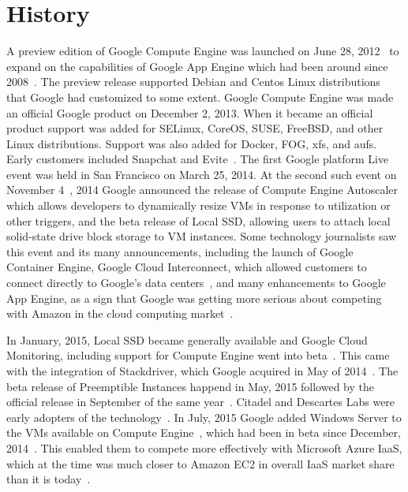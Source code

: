 \section{History}
A preview edition of Google Compute Engine was launched on June 28,
2012~\cite{hid-sp18-419-googleblog20120628} to expand on the
capabilities of Google App Engine which had been around since
2008~\cite{hid-sp18-419-gcp-history-medium}. The preview release
supported Debian and Centos Linux distributions that Google had
customized to some extent. Google Compute Engine was made an official
Google product on December 2, 2013. When it became an official product
support was added for SELinux, CoreOS, SUSE, FreeBSD, and other Linux
distributions. Support was also added for Docker, FOG, xfs, and
aufs. Early customers included Snapchat and
Evite~\cite{hid-sp18-419-googleblog20131202}. The first Google
platform Live event was held in San Francisco on March 25, 2014. At
the second such event on November
4~\cite{hid-sp18-419-googleblog20140812}, 2014 Google announced the
release of Compute Engine Autoscaler which allows developers to
dynamically resize VMs in response to utilization or other triggers,
and the beta release of Local SSD, allowing users to attach local
solid-state drive block storage to VM instances. Some technology
journalists saw this event and its many announcements, including the
launch of Google Container Engine, Google Cloud Interconnect, which
allowed customers to connect directly to Google's data
centers~\cite{hid-sp18-419-gcp-techcrunch-20141104}, and many
enhancements to Google App Engine, as a sign that Google was getting
more serious about competing with Amazon in the cloud computing
market~\cite{hid-sp18-419-forbes-gcp-20141104}.

In January, 2015, Local SSD became generally available and Google
Cloud Monitoring, including support for Compute Engine went into
beta~\cite{hid-sp18-419-googleblog20150113}. This came with the
integration of Stackdriver, which Google acquired in May of
2014~\cite{hid-sp18-419-googleblog20140507}. The beta release of
Preemptible Instances happend in May, 2015 followed by the official
release in September of the same
year~\cite{hid-sp18-419-venturebeat-preemptive-vms}. Citadel and
Descartes Labs were early adopters of the
technology~\cite{hid-sp18-419-googleblog20150518}. In July, 2015
Google added Windows Server to the VMs available on Compute
Engine~\cite{hid-sp18-419-googleblog20150715}, which had been in beta
since December, 2014~\cite{hid-sp18-419-googleblog20141208}. This
enabled them to compete more effectively with Microsoft Azure IaaS,
which at the time was much closer to Amazon EC2 in overall IaaS market
share than it is today~\cite{hid-sp18-419-statista-iaas-market2015}.

